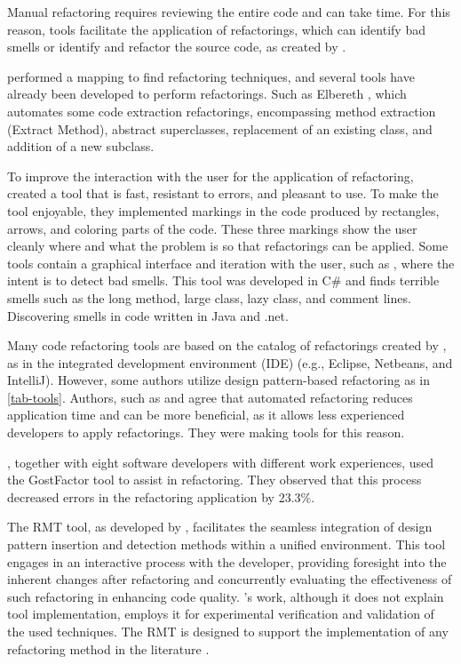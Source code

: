 Manual refactoring requires reviewing the entire code and can take time. For this reason, tools facilitate the application of refactorings, which can identify bad smells or identify and refactor the source code, as created by \textcite{beluzzo2018abordagem}.

\textcite{beluzzo2018abordagem} performed a mapping to find refactoring techniques, and several tools have already been developed to perform refactorings. Such as Elbereth \cite{korman1998elbereth}, which automates some code extraction refactorings, encompassing method extraction (Extract Method), abstract superclasses, replacement of an existing class, and addition of a new subclass.

To improve the interaction with the user for the application of refactoring, \cite{murphy2008breaking} created a tool that is fast, resistant to errors, and pleasant to use. To make the tool enjoyable, they implemented markings in the code produced by rectangles, arrows, and coloring parts of the code. These three markings show the user cleanly where and what the problem is so that refactorings can be applied.
Some tools contain a graphical interface and iteration with the user, such as \textcite{rani2014detection}, where the intent is to detect bad smells. This tool was developed in C\# and finds terrible smells such as the long method, large class, lazy class, and comment lines. Discovering smells in code written in Java and .net. 

Many code refactoring tools are based on the catalog of refactorings created by \textcite{fowler2018refactoring}, as in the integrated development environment (IDE) (e.g., Eclipse, Netbeans, and IntelliJ). However, some authors utilize design pattern-based refactoring as in \cref{tab-tools}. Authors, such as \textcite{cinneide2000automated} and \textcite{CHRISTOPOULOU20121201} agree that automated refactoring reduces application time and can be more beneficial, as it allows less experienced developers to apply refactorings. They were making tools for this reason.

\textcite{murphy2008breaking}, together with eight software developers with different work experiences, used the GostFactor tool to assist in refactoring. They observed that this process decreased errors in the refactoring application by 23.3\%.

The RMT tool, as developed by \textcite{beluzzo2018abordagem}, facilitates the seamless integration of design pattern insertion and detection methods within a unified environment. This tool engages in an interactive process with the developer, providing foresight into the inherent changes after refactoring and concurrently evaluating the effectiveness of such refactoring in enhancing code quality. \textcite{sangeetha2019empirical} 's work, although it does not explain tool implementation, employs it for experimental verification and validation of the used techniques. The RMT is designed to support the implementation of any refactoring method in the literature \cite{beluzzo2018abordagem}.

